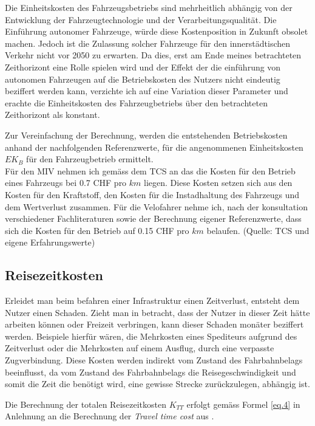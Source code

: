 Die Einheitskosten des Fahrzeugsbetriebs sind mehrheitlich abhängig von der Entwicklung der Fahrzeugtechnologie und der Verarbeitungsqualität. 
Die Einführung autonomer Fahrzeuge, würde diese Kostenposition in Zukunft obsolet machen. Jedoch ist die Zulassung solcher Fahrzeuge für den innerstädtischen Verkehr nicht vor 2050 zu erwarten. Da dies, erst am Ende meines betrachteten Zeithorizont eine Rolle spielen wird und der Effekt der die einführung von autonomen Fahrzeugen auf die Betriebskosten des Nutzers nicht eindeutig beziffert werden kann, verzichte ich auf eine Variation dieser Parameter und erachte die Einheitskosten des Fahrzeugbetriebs über den betrachteten Zeithorizont als konstant.

Zur Vereinfachung der Berechnung, werden die entstehenden Betriebskosten anhand der nachfolgenden Referenzwerte, für die angenommenen Einheitskosten $EK_{B}$ für den Fahrzeugbetrieb ermittelt. \\
Für den MIV nehmen ich gemäss dem TCS an das die Kosten für den Betrieb eines Fahrzeugs bei 0.7 CHF pro $km$ liegen. Diese Kosten setzen sich aus den Kosten für den Kraftstoff, den Kosten für die Instadhaltung des Fahrzeugs und dem Wertverlust zusammen. Für die Velofahrer nehme ich, nach der konsultation verschiedener Fachliteraturen sowie der Berechnung eigener Referenzwerte, dass sich die Kosten für den Betrieb auf 0.15 CHF pro $km$ belaufen. (Quelle: TCS und eigene Erfahrungswerte)




\subsection*{Reisezeitkosten}
\label{sub:Reisezeit}

Erleidet man beim befahren einer Infrastruktur einen Zeitverlust, entsteht dem Nutzer einen Schaden. Zieht man in betracht, dass der Nutzer in dieser Zeit hätte arbeiten können oder Freizeit verbringen, kann dieser Schaden monäter beziffert werden. Beispiele hierfür wären, die Mehrkosten eines Spediteurs aufgrund des Zeitverlust oder die Mehrkosten auf einem Ausflug, durch eine verpasste Zugverbindung.
Diese Kosten werden indirekt vom Zustand des Fahrbahnbelags beeinflusst, da vom Zustand des Fahrbahnbelags die Reisegeschwindigkeit und somit die Zeit die benötigt wird, eine gewisse Strecke zurückzulegen, abhängig ist.

Die Berechnung der totalen Reisezeitkosten $K_{TT}$ erfolgt gemäss Formel \ref{eq.4} in Anlehnung an die Berechnung der \textit{Travel time cost} aus \cite[S.643]{Adey2012}.

